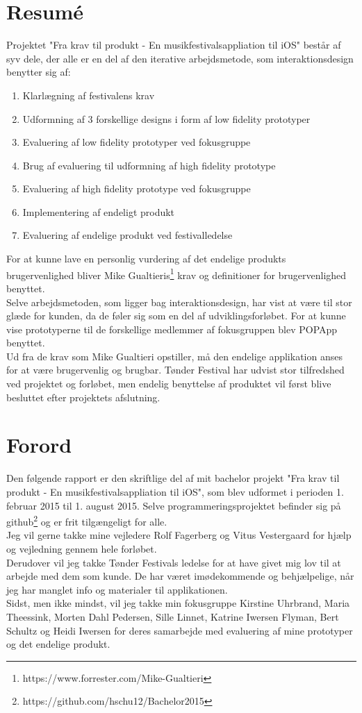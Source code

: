 \documentclass[a4paper,10pt,titlepage]{article}
\begin{document}
\section{Resumé}
Projektet "Fra krav til produkt - En musikfestivalsappliation til iOS" består af syv dele, der alle er en del af den iterative arbejdsmetode, som interaktionsdesign benytter sig af:
\begin{enumerate}
\item
Klarlægning af festivalens krav
\item
Udformning af 3 forskellige designs i form af low fidelity prototyper
\item
Evaluering af low fidelity prototyper ved fokusgruppe
\item
Brug af evaluering til udformning af high fidelity prototype
\item
Evaluering af high fidelity prototype ved fokusgruppe
\item
Implementering af endeligt produkt
\item
Evaluering af endelige produkt ved festivalledelse
\end{enumerate}
For at kunne lave en personlig vurdering af det endelige produkts brugervenlighed bliver Mike Gualtieris\footnote{https://www.forrester.com/Mike-Gualtieri} krav og definitioner for brugervenlighed benyttet.\\
Selve arbejdsmetoden, som ligger bag interaktionsdesign, har vist at være til stor glæde for kunden, da de føler sig som en del af udviklingsforløbet. For at kunne vise prototyperne til de forskellige medlemmer af fokusgruppen blev POPApp benyttet.\\
Ud fra de krav som Mike Gualtieri opstiller, må den endelige applikation anses for at være brugervenlig og brugbar. Tønder Festival har udvist stor tilfredshed ved projektet og forløbet, men endelig benyttelse af produktet vil først blive besluttet efter projektets afslutning.
\section{Forord}
Den følgende rapport er den skriftlige del af mit bachelor projekt "Fra krav til produkt - En musikfestivalsappliation til iOS", som blev udformet i perioden 1. februar 2015 til 1. august 2015. Selve programmeringsprojektet befinder sig på github\footnote{https://github.com/hschu12/Bachelor2015} og er frit tilgængeligt for alle. \\
Jeg vil gerne takke mine vejledere Rolf Fagerberg og Vitus Vestergaard for hjælp og vejledning gennem hele forløbet. \\
Derudover vil jeg takke Tønder Festivals ledelse for at have givet mig lov til at arbejde med dem som kunde. De har været imødekommende og behjælpelige, når jeg har manglet info og materialer til applikationen. \\
Sidst, men ikke mindst, vil jeg takke min fokusgruppe Kirstine Uhrbrand, Maria Theessink, Morten Dahl Pedersen, Sille Linnet, Katrine Iwersen Flyman, Bert Schultz og Heidi Iwersen for deres samarbejde med evaluering af mine prototyper og det endelige produkt. 
\end{document}
